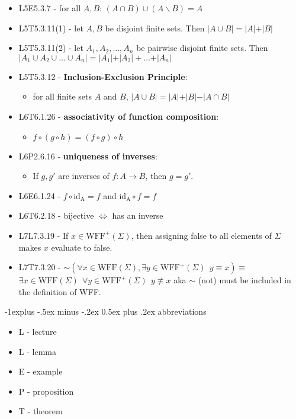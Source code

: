 \documentclass[10pt, landscape]{article}
\makeatletter
\renewcommand{\subsection}{\@startsection{subsection}{2}{0mm}%
                                {-1explus -.5ex minus -.2ex}%
                                {0.5ex plus .2ex}%
                                {\normalfont\normalsize\bfseries}}
\renewcommand{\lnot}{\mathord{\sim}}
\renewcommand{\bf}[1]{\textbf{#1}}
\let\Iff\Leftrightarrow
\makeatother
\begin{document}
\begin{multicols*}{3}
\begin{itemize}
        \item L5E5.3.7 - for all $A, B$: $(A \cap B) \cup (A \backslash B) = A$
        \item L5T5.3.11(1) - let $A, B$ be disjoint finite sets. Then $\vert A \cup B \vert = \vert A \vert + \vert B \vert$
        \item L5T5.3.11(2) - let $A_1, A_2, \dots, A_n$ be pairwise disjoint finite sets. Then $\vert A_1 \cup A_2 \cup \dots \cup A_n \vert = \vert A_1 \vert + \vert A_2 \vert + \dots + \vert A_n \vert$
        \item L5T5.3.12 - \bf{Inclusion-Exclusion Principle}: 
        \begin{itemize}
            \item for all finite sets $A$ and $B$, $\vert A \cup B \vert = \vert A \vert + \vert B \vert - \vert A \cap B \vert$
        \end{itemize} 
        \item L6T6.1.26 - \bf{associativity of function composition}: 
        \begin{itemize}
            \item $f\circ (g \circ h) = (f \circ g) \circ h$
        \end{itemize}
        \item L6P2.6.16 - \bf{uniqueness of inverses}: 
        \begin{itemize}
            \item If $g, g'$ are inverses of $f: A \to B$, then $g = g'$.
        \end{itemize} 
        \item L6E6.1.24 - $f \circ \text{id}_\text{A} = f$ and $\text{id}_\text{A} \circ f = f$
        \item L6T6.2.18 - bijective $\Iff$ has an inverse
        \item L7L7.3.19 - If $x \in \text{WFF}^+(\Sigma)$, then assigning false to all elements of $\Sigma$ makes $x$ evaluate to false.
        \item L7T7.3.20 - $\lnot( \forall x \in \text{WFF}(\Sigma), \exists y \in \text{WFF}^+(\Sigma) \ \ y \equiv x ) \equiv$
            $\exists x \in \text{WFF}(\Sigma) \ \ \forall y \in \text{WFF}^+(\Sigma) \ \ y \not\equiv x$
            aka $\lnot$ (not) must be included in the definition of WFF.
    \end{itemize}

    \subsection{abbreviations}
    \begin{itemize}
        \item L - lecture
        \item L - lemma
        \item E - example
        \item P - proposition
        \item T - theorem
    \end{itemize}
\end{multicols*}
\end{document}
